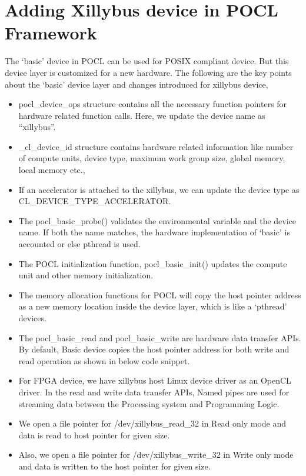 \section{Adding Xillybus device in POCL Framework}
The ‘basic’ device in POCL can be used for POSIX compliant device. But this device layer is customized for a new hardware. The following are the key points about the ‘basic’ device layer and changes introduced for xillybus device,
\begin{itemize}
	\item pocl\_device\_ops structure contains all the necessary function pointers for hardware related function calls. Here, we update the device name as “xillybus”. 
	\item \_cl\_device\_id structure contains hardware related information like number of compute units, device type, maximum work group size, global memory, local memory etc.,
	\item If an accelerator is attached to the xillybus, we can update the device type as CL\_DEVICE\_TYPE\_ACCELERATOR.
	\item The pocl\_basic\_probe() validates the environmental variable and the device name. If both the name matches, the hardware implementation of ‘basic’ is accounted or else pthread is used.
	\item The POCL initialization function, pocl\_basic\_init() updates the compute unit and other memory initialization.
	\item The memory allocation functions for POCL will copy the host pointer address as a new memory location inside the device layer, which is like a ‘pthread’ devices.
	\item The pocl\_basic\_read and pocl\_basic\_write are hardware data transfer APIs. By default, Basic device copies the host pointer address for both write and read operation as shown in below code snippet.
	
	\item For FPGA device, we have xillybus host Linux device driver as an OpenCL driver. In the read and write data transfer APIs, Named pipes are used for streaming data between the Processing system and Programming Logic.
	\item We open a file pointer for /dev/xillybus\_read\_32 in Read only mode and data is read to host pointer for given size.
	
	\item Also, we open a file pointer for /dev/xillybus\_write\_32 in Write only mode and data is written to the host pointer for given size.
	
\end{itemize}

